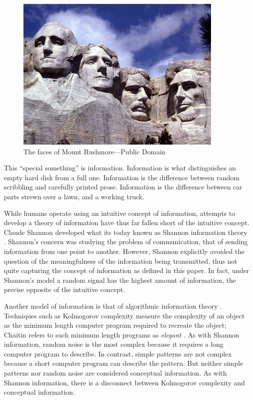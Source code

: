 \begin{figure}
\centering
\includegraphics[width=4in]{MountRushmore.jpg}
\caption{The faces of Mount Rushmore---Public Domain}
\end{figure}

This ``special something'' is information.
Information is what distinguishes an empty hard disk from a full one.
Information is the difference between random scribbling and carefully printed prose.
Information is the difference between car parts strewn over a lawn, and a working truck.

While humans operate using an intuitive concept of information, attempts to develop a theory of information have thus far fallen short of the intuitive concept.
Claude Shannon developed what its today known as Shannon information theory \citep{Shannon1948}.
Shannon's concern was studying the problem of communication, that of sending information from one point to another.
However, Shannon explicitly avoided the question of the meaningfulness of the information being transmitted, thus not quite capturing the concept of information as defined in this paper.
In fact, under Shannon's model a random signal has the highest amount of information, the precise opposite of the intuitive concept.

Another model of information is that of algorithmic information theory \citep{Chaitin1966, Solomonoff1960, Kolmogorov1968a}.
Techniques such as Kolmogorov complexity measure the complexity of an object as the minimum length computer program required to recreate the object; Chaitin refers to such minimum length programs as \textit{elegant} \citep{Chaitin2002}.
As with Shannon information, random noise is the most complex because it requires a long computer program to describe.
In contrast, simple patterns are not complex because a short computer program can describe the pattern.
But neither simple patterns nor random noise are considered conceptual information.
As with Shannon information, there is a disconnect between Kolmogorov complexity and conceptual information.

